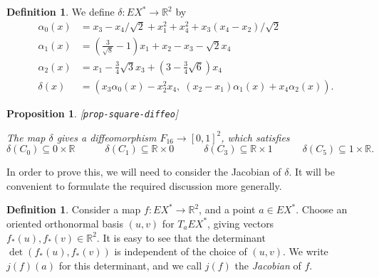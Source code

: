 \documentclass[reqno]{amsart}
\newcommand{\lbl}[1]{\label{#1}\textup{[\texttt{#1}]}\par}
\newcommand{\lbl}{\label}
\newcommand{\al}        {\alpha}
\newcommand{\dl}        {\delta}
\newcommand{\R}         {{\mathbb{R}}}
\newcommand{\tm}        {\times}
\newcommand{\sse}       {\subseteq}
\newcommand{\rt}        {\sqrt{2}}
\renewcommand{\:}{\colon}
\newtheorem{proposition}[theorem]{Proposition}
\theoremstyle{definition}
\newtheorem{definition}[theorem]{Definition}
\begin{document}
\begin{definition}
 We define $\dl\:EX^*\to\R^2$ by
 \begin{align*}
  \al_0(x) &= x_3 - x_4/\rt + x_1^2 + x_4^2 + x_3(x_4 - x_2)/\rt \\
  \al_1(x) &= (\tfrac{3}{\sqrt{8}}-1)x_1+x_2-x_3-\rt x_4 \\
  \al_2(x) &= x_1 - \tfrac{3}{4}\sqrt{3}x_3 +
               (3-\tfrac{3}{4}\sqrt{6})x_4 \\
  \dl(x)   &=
   \left(x_3\al_0(x) - x_2^2x_4,\; (x_2-x_1)\al_1(x) + x_4\al_2(x)\right).
 \end{align*}
\end{definition}

\begin{proposition}\lbl{prop-square-diffeo}
 The map $\dl$ gives a diffeomorphism $F_{16}\to[0,1]^2$, which satisfies
 \[ \dl(C_0)\sse 0 \tm\R \hspace{3em}
    \dl(C_1)\sse \R\tm 0 \hspace{3em}
    \dl(C_3)\sse \R\tm 1 \hspace{3em}
    \dl(C_5)\sse 1 \tm\R.
 \]
\end{proposition}

In order to prove this, we will need to consider the Jacobian of
$\dl$.  It will be convenient to formulate the required discussion
more generally.
\begin{definition}
 Consider a map $f\:EX^*\to\R^2$, and a point $a\in EX^*$.  Choose an
 oriented orthonormal basis $(u,v)$ for $T_aEX^*$, giving vectors
 $f_*(u),f_*(v)\in\R^2$.  It is easy to see that the determinant
 $\det(f_*(u),f_*(v))$ is independent of the choice of $(u,v)$. We
 write $j(f)(a)$ for this determinant, and we call $j(f)$ the
 \emph{Jacobian} of $f$.
\end{definition}
\end{document}
